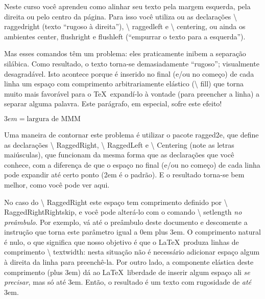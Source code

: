 \documentclass[a4paper,12pt]{article}
\newcommand{\ambiente}[1]{{\normalfont\color{orange!70!black} #1}}
\newcommand{\cola}[1]{{\normalfont\ttfamily #1}}
\newcommand{\comando}[1]{{\normalfont\sffamily\textbackslash\color{blue!30!black} #1}}
\newcommand{\pacote}[1]{{\normalfont\color{red!70!black} #1}}
\newlength{\myparindent}
\begin{document}
	

	Neste curso você aprendeu como alinhar seu texto pela margem esquerda, pela direita ou pelo centro da página. Para isso você utiliza ou as declarações \comando{raggedright} (texto ``rugoso à direita''), \comando{raggedleft} e \comando{centering}, ou ainda os ambientes \ambiente{center}, \ambiente{flushright} e \ambiente{flushleft} (``empurrar o texto para a esquerda'').

	

	\raggedright %

	\setlength{\parindent}{\myparindent} %

	Mas esses comandos têm um problema: eles praticamente inibem a separação silábica. Como resultado, o texto torna-se demasiadamente ``rugoso''; visualmente desagradável. Isto acontece porque é inserido no final (e/ou no começo) de cada linha um espaço com comprimento arbitrariamente elástico (\comando{fill}) que torna muito mais favorável para o \TeX\ expandí-lo à vontade (para preencher a linha) a separar alguma palavra. Este parágrafo, em especial, sofre este efeito!

		

	\hfill$\unit{3}{em} = \text{largura de MMM}$ %

	

	\RaggedRight %

	Uma maneira de contornar este problema é utilizar o pacote \pacote{ragged2e}, que define as declarações \comando{RaggedRight}, \comando{RaggedLeft} e \comando{Centering} (note as letras maiúsculas), que funcionam da mesma forma que as declarações que você conhece, com a diferença de que o espaço no final (e/ou no começo) de cada linha pode expandir até certo ponto (\unit{2}{em} é o padrão). E o resultado torna-se bem melhor, como você pode ver aqui.

		

	No caso do \comando{RaggedRight} este espaço tem comprimento definido por \comando{RaggedRightRightskip}, e você pode alterá-lo com o comando \comando{setlength} \emph{no preâmbulo}. Por exemplo, vá até o preâmbulo deste documento e descomente a instrução que torna este parâmetro igual a \cola{0em plus 3em}. O comprimento natural é nulo, o que significa que nosso objetivo é que o \LaTeX\ produza linhas de comprimento \comando{textwidth}: nesta situação não é necessário adicionar espaço algum à direita da linha para preenchê-la. Por outro lado, a componente elástica deste comprimento (\cola{plus 3em}) dá ao \LaTeX\ liberdade de inserir algum espaço ali \emph{se precisar}, mas só até \unit{3}{em}. Então, o resultado é um texto com rugosidade de \emph{até} \unit{3}{em}.
\end{document}
